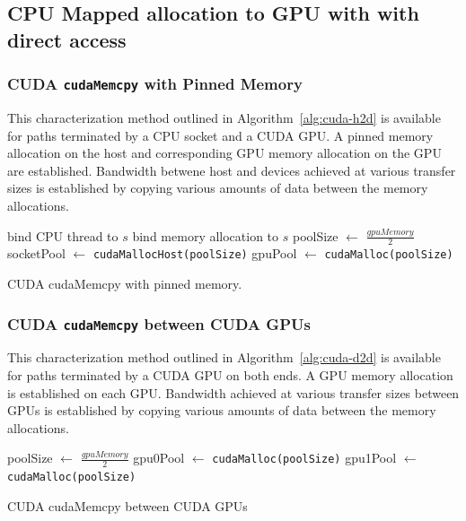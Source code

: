\subsection{CPU Mapped allocation to GPU with with direct access}
\label{sec:cpu-gpu-direct}

\subsubsection{CUDA \texttt{cudaMemcpy} with Pinned Memory}

This characterization method outlined in Algorithm~\ref{alg:cuda-h2d} is available for paths terminated by a CPU socket and a CUDA GPU.
A pinned memory allocation on the host and corresponding GPU memory allocation on the GPU are established.
Bandwidth betwene host and devices achieved at various transfer sizes is established by copying various amounts of data between the memory allocations.

\begin{algorithm}[ht]
    \SetAlgoLined
    bind CPU thread to $s$\;
    bind memory allocation to $s$\;
    poolSize $\gets$ $\frac{gpuMemory}{2}$\;
    socketPool $\gets$ \texttt{cudaMallocHost(poolSize)}\;
    gpuPool $\gets$ \texttt{cudaMalloc(poolSize)}\;
    \caption{CUDA cudaMemcpy with pinned memory.}
    \label{alg:cuda-h2d}
\end{algorithm}

\subsubsection{CUDA \texttt{cudaMemcpy} between CUDA GPUs}

This characterization method outlined in Algorithm~\ref{alg:cuda-d2d} is available for paths terminated by a CUDA GPU on both ends.
A GPU memory allocation is established on each GPU.
Bandwidth achieved at various transfer sizes between GPUs is established by copying various amounts of data between the memory allocations.

\begin{algorithm}[ht]
    \SetAlgoLined
    poolSize $\gets$ $\frac{gpuMemory}{2}$\;
    gpu0Pool $\gets$ \texttt{cudaMalloc(poolSize)}\;
    gpu1Pool $\gets$ \texttt{cudaMalloc(poolSize)}\;
    \caption{CUDA cudaMemcpy between CUDA GPUs}
    \label{alg:cuda-d2d}
\end{algorithm}

